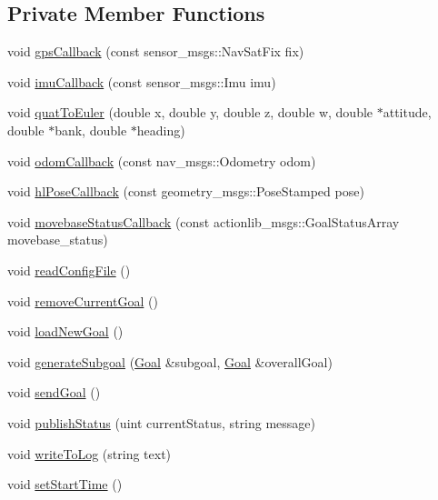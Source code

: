 \subsection*{\-Private \-Member \-Functions}
\begin{DoxyCompactItemize}
\item 
void \hyperlink{classGoalProvider_aa68c410fb110c40cc31dc99320f20a60}{gps\-Callback} (const sensor\-\_\-msgs\-::\-Nav\-Sat\-Fix fix)
\item 
void \hyperlink{classGoalProvider_a9aa7639c95eff543d55fef82ba005088}{imu\-Callback} (const sensor\-\_\-msgs\-::\-Imu imu)
\item 
void \hyperlink{classGoalProvider_a5448a289886afe3e96a900bd0b8557d4}{quat\-To\-Euler} (double x, double y, double z, double w, double $\ast$attitude, double $\ast$bank, double $\ast$heading)
\item 
void \hyperlink{classGoalProvider_a743391f99e7cfa26845014c06332ede7}{odom\-Callback} (const nav\-\_\-msgs\-::\-Odometry odom)
\item 
void \hyperlink{classGoalProvider_a6e91d11b611820597420497fd82613d1}{hl\-Pose\-Callback} (const geometry\-\_\-msgs\-::\-Pose\-Stamped pose)
\item 
void \hyperlink{classGoalProvider_a13d66dd274899d8012a021ef2cbeab7e}{movebase\-Status\-Callback} (const actionlib\-\_\-msgs\-::\-Goal\-Status\-Array movebase\-\_\-status)
\item 
void \hyperlink{classGoalProvider_a58ec86314e501683db946eba1141d464}{read\-Config\-File} ()
\item 
void \hyperlink{classGoalProvider_a8089b33dddf424c923e74d771574edb7}{remove\-Current\-Goal} ()
\item 
void \hyperlink{classGoalProvider_aa8e215f654aa702f0ee949fb95538fed}{load\-New\-Goal} ()
\item 
void \hyperlink{classGoalProvider_aa86d86dde0ce1948dca9a06abf6b3fdd}{generate\-Subgoal} (\hyperlink{classGoal}{\-Goal} \&subgoal, \hyperlink{classGoal}{\-Goal} \&overall\-Goal)
\item 
void \hyperlink{classGoalProvider_ace0fb8a759d933ba643664e4f261241e}{send\-Goal} ()
\item 
void \hyperlink{classGoalProvider_a3ce49c1e51eae73ba9820b89f03b8e5a}{publish\-Status} (uint current\-Status, string message)
\item 
void \hyperlink{classGoalProvider_accc06df736068317e64060ceae2512ae}{write\-To\-Log} (string text)
\item 
void \hyperlink{classGoalProvider_a967141633b8fba8dcc158074775fb1a1}{set\-Start\-Time} ()
\end{DoxyCompactItemize}
